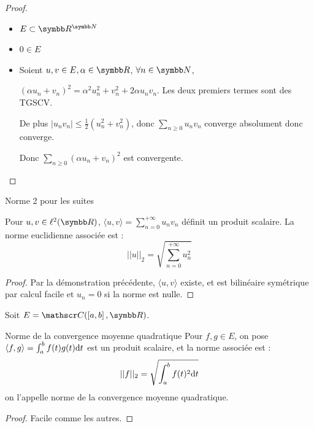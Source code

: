 
\begin{proof}~
    \begin{itemize}
        \item $E \subset \R^{\N}$
        
        \item $0 \in E$

        \item Soient $u, v \in E, \alpha \in \R$, $\forall n \in \N$,
        
        $(\alpha u_n + v_n)^2 = \alpha^2u_n^2 + v_n^2 + 2 \alpha u_n v_n$. Les deux premiers termes sont des TGSCV.

        De plus $|u_n v_n| \leqslant \frac 1 2 (u_n^2 + v_n^2)$, donc $\sum_{n \geqslant 0} u_n v_n$ converge absolument donc converge. 

        Donc $\sum_{n \geqslant 0} (\alpha u_n + v_n)^2$ est convergente. 
    \end{itemize}
\end{proof}

\begin{theoreme}{Norme 2 pour les suites}{}

    Pour $u, v \in \ell^2(\R)$, $\displaystyle \langle u, v \rangle = \sum_{n = 0 }^{+ \infty} u_n v_n$
    définit un produit scalaire. 
    La norme euclidienne associée est : 
    \[||u||_2 = \sqrt{\sum_{n = 0 }^{+\infty}u_n^2}\]
\end{theoreme}

\begin{proof}
    Par la démonstration précédente, $\langle u, v \rangle$ existe, et est bilinéaire symétrique par calcul 
    facile et $u_n = 0$ si la norme est nulle. 
\end{proof}

Soit $E = \mathscr C(\inter{a}{b}, \R)$.

\begin{theoreme}{Norme de la convergence moyenne quadratique}{}
    Pour $f, g \in E$, on pose 
    $\langle f, g \rangle = \int_{a}^{b} f(t)g(t) \text d t$
    est un produit scalaire, et la norme associée est :
    \[||f||_2 = \sqrt{\int_{a }^{b } f(t)^2 \text d t}\]
    on l'appelle norme de la convergence moyenne quadratique. 
\end{theoreme}

\begin{proof}
    Facile comme les autres.
\end{proof}

